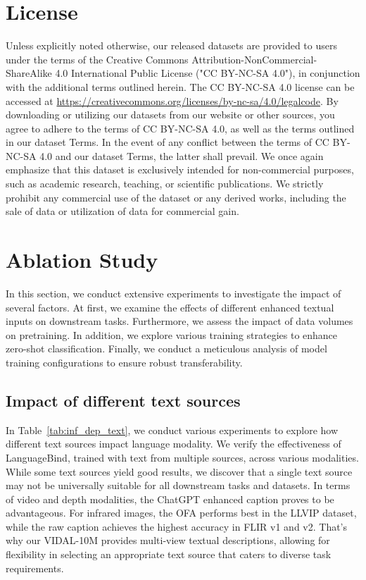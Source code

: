 \documentclass{article} \usepackage{iclr2024_conference,times}
\begin{document}
\section{License}
Unless explicitly noted otherwise, our released datasets are provided to users under the terms of the Creative Commons Attribution-NonCommercial-ShareAlike 4.0 International Public License ("CC BY-NC-SA 4.0"), in conjunction with the additional terms outlined herein. The CC BY-NC-SA 4.0 license can be accessed at \url{https://creativecommons.org/licenses/by-nc-sa/4.0/legalcode}. By downloading or utilizing our datasets from our website or other sources, you agree to adhere to the terms of CC BY-NC-SA 4.0, as well as the terms outlined in our dataset Terms. In the event of any conflict between the terms of CC BY-NC-SA 4.0 and our dataset Terms, the latter shall prevail.
We once again emphasize that this dataset is exclusively intended for non-commercial purposes, such as academic research, teaching, or scientific publications. We strictly prohibit any commercial use of the dataset or any derived works, including the sale of data or utilization of data for commercial gain.











\section{Ablation Study}
In this section, we conduct extensive experiments to investigate the impact of several factors. At first, we examine the effects of different enhanced textual inputs on downstream tasks.
Furthermore, we assess the impact of data volumes on pretraining. In addition, we explore various training strategies to enhance zero-shot classification. Finally, we conduct a meticulous analysis of model training configurations to ensure robust transferability.

\subsection{Impact of different text sources}

In Table~\ref{tab:inf_dep_text}, we conduct various experiments to explore how different text sources impact language modality. We verify the effectiveness of LanguageBind, trained with text from multiple sources, across various modalities. While some text sources yield good results, we discover that a single text source may not be universally suitable for all downstream tasks and datasets. In terms of video and depth modalities, the ChatGPT enhanced caption proves to be advantageous. For infrared images, the OFA performs best in the LLVIP dataset, while the raw caption achieves the highest accuracy in FLIR v1 and v2. That's why our VIDAL-10M provides multi-view textual descriptions, allowing for flexibility in selecting an appropriate text source that caters to diverse task requirements.
\end{document}
